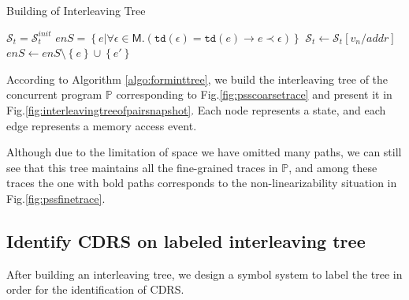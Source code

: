 \documentclass[runningheads]{llncs}
\newcommand{\pair}[1]{{\langle{#1}\rangle}}
\newcommand{\sset}[1]{\left\{{#1}\right\}}
\begin{document}
\begin{algorithm}
    \caption{Building of Interleaving Tree}\label{algo:forminttree}
    \begin{algorithmic}[1]
        \State $\mathcal{S}_t = \mathcal{S}_t^{init}$ 
        \State $\mathit{enS} = \left\{ e | \forall \epsilon\in \mathsf{M} .(\mathtt{td}(\epsilon)=\mathtt{td}(e)\longrightarrow e\prec \epsilon)\right\}$ 
            \State {}
            \For{$e(addr,v_n)^{\pair{o,t}} \leftarrow \mathit{enS}$}
                \State {}
                \State $\mathcal{S}_t \gets \mathit{\mathcal{S}_t[v_n/addr]}$ 
                \State $\mathit{enS} \gets \mathit{enS}\setminus \sset{e} \cup \sset{e'}$ 
                \State {} 
            \EndFor
        \EndFunction
    \end{algorithmic}
\end{algorithm}


\begin{example} 
According to Algorithm \ref{algo:forminttree}, we build the interleaving tree of the concurrent program $\mathbb{P}$ corresponding to Fig.\ref{fig:psscoarsetrace} and present it in Fig.\ref{fig:interleavingtreeofpairsnapshot}. Each node represents a state, and each edge represents a memory access event.

Although due to the limitation of space we have omitted many paths, we can still see that this tree maintains all the fine-grained traces in $\mathbb{P}$, and among these traces the one with bold paths corresponds to 
the non-linearizability situation in Fig.\ref{fig:pssfinetrace}.



\end{example}






\subsection{Identify CDRS on labeled interleaving tree}\label{sec:identifycdrs}
After building an interleaving tree, we design a symbol system to label the tree in order for the identification of CDRS.
\end{document}
